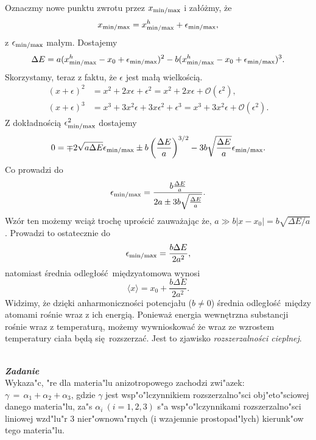 \documentclass[11pt,a4paper]{article}
\newcounter{zadanie}\newcommand{\zadanie}[1][]{\addtocounter{zadanie}{1} ~\\  {\bf \emph{Zadanie \arabic{zadanie} #1 }} \\}
\begin{document}
Oznaczmy nowe punktu zwrotu przez $x_{\rm min/max}$ i załóżmy, że
\begin{equation}
	x_{\rm min/max} = x_{\rm min/max}^h + \epsilon_{\rm min/max},
\end{equation}
z $\epsilon_{\rm min/max}$ małym. Dostajemy
\begin{equation}
	\Delta E = a ( x_{\rm min/max}^h - x_0 + \epsilon_{\rm min/max})^2 - b ( x_{\rm min/max}^h - x_0 + \epsilon_{\rm min/max})^3.
\end{equation}
Skorzystamy, teraz z faktu, że $\epsilon$ jest małą wielkością. 
\begin{align}
	(x + \epsilon)^2 &= x^2 + 2 x \epsilon + \epsilon^2 = x^2 + 2x \epsilon + \mathcal{O}(\epsilon^2), \\
	(x + \epsilon)^3 &= x^3 + 3 x^2 \epsilon + 3 x \epsilon^2 + \epsilon^3  = x^3 + 3 x^2 \epsilon + \mathcal{O}(\epsilon^2).
\end{align}
Z dokładnością $\epsilon_{\rm min/max}^2$ dostajemy
\begin{equation}
	0 = \mp 2 \sqrt{a \Delta E} \epsilon_{\rm min/max} \pm b \left( \frac{\Delta E}{a}\right)^{3/2} - 3b \sqrt{\frac{\Delta E}{a}} \epsilon_{\rm min/max}.
\end{equation}
Co prowadzi do 
\begin{equation}
	\epsilon_{\rm min/max} = \frac{b \frac{\Delta E}{a}}{2a \pm 3b \sqrt{\frac{\Delta E}{a}}}.
\end{equation}
Wzór ten możemy wciąż trochę uprościć zauważając że, $a \gg b |x - x_0| = b \sqrt{\Delta E/a}$. Prowadzi to ostatecznie do 
\begin{equation}
	\epsilon_{\rm min/max} = \frac{b \Delta E}{2 a^2}, 
\end{equation}
natomiast średnia odległość międzyatomowa wynosi
\begin{equation}
	\langle x \rangle = x_0 + \frac{b \Delta E}{2 a^2}.
\end{equation}
Widzimy, że dzięki anharmoniczności potencjału ($b \neq 0$) średnia odległość między atomami rośnie wraz z ich energią. Ponieważ energia wewnętrzna substancji rośnie wraz z temperaturą, możemy wywnioskować że wraz ze wzrostem temperatury ciała będą się rozszerzać. Jest to zjawisko \emph{rozszerzalności cieplnej}.

\zadanie
Wykaza"c, "re dla materia"lu anizotropowego zachodzi zwi"azek:
$\gamma\,=\,\alpha_1+\alpha_2+\alpha_3$, gdzie $\gamma$ jest wsp"o"lczynnikiem rozszerzalno"sci obj"eto"sciowej danego materia"lu, za"s $\alpha_i ~(i=1,2,3)$
s"a wsp"o"lczynnikami rozszerzalno"sci liniowej wzd"lu"r 3 
nier"ownowa"rnych (i wzajemnie prostopad"lych) kierunk"ow tego materia"lu.
\end{document}
